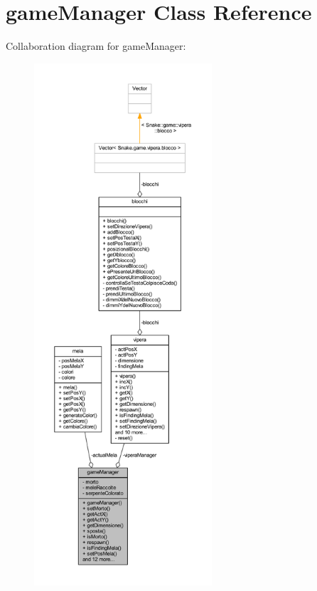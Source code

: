 \hypertarget{class_snake_1_1game_1_1utility_1_1game_manager}{}\section{game\+Manager Class Reference}
\label{class_snake_1_1game_1_1utility_1_1game_manager}


Collaboration diagram for game\+Manager\+:
\nopagebreak
\begin{figure}[H]
\begin{center}
\leavevmode
\includegraphics[height=550pt]{class_snake_1_1game_1_1utility_1_1game_manager__coll__graph}
\end{center}
\end{figure}
